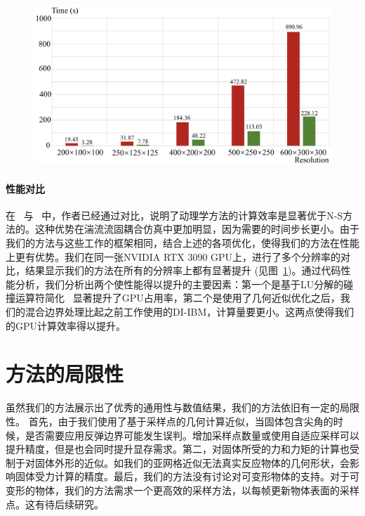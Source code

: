\begin{figure}[!tb]
  \centering
    \includegraphics[width=0.93\columnwidth]{figures/performance.png}
  \label{img:Performance}
\end{figure}

\paragraph{性能对比}
在~\citep{Li-2020} 与~\citep{Chen-2021} 中，作者已经通过对比，说明了动理学方法的计算效率是显著优于N-S方法的。这种优势在湍流流固耦合仿真中更加明显，因为需要的时间步长更小。由于我们的方法与这些工作的框架相同，结合上述的各项优化，使得我们的方法在性能上更有优势。我们在同一张NVIDIA RTX 3090 GPU上，进行了多个分辨率的对比，结果显示我们的方法在所有的分辨率上都有显著提升 (见图~\ref{img:Performance})。通过代码性能分析，我们分析出两个使性能得以提升的主要因素：第一个是基于LU分解的碰撞运算符简化~\citep{fei2018three} 显著提升了GPU占用率，第二个是使用了几何近似优化之后，我们的混合边界处理比起之前工作使用的DI-IBM，计算量要更小。这两点使得我们的GPU计算效率得以提升。

\section{方法的局限性}
虽然我们的方法展示出了优秀的通用性与数值结果，我们的方法依旧有一定的局限性。
首先，由于我们使用了基于采样点的几何计算近似，当固体包含尖角的时候，是否需要应用反弹边界可能发生误判。增加采样点数量或使用自适应采样可以提升精度，但是也会同时提升显存需求。第二，对固体所受的力和力矩的计算也受制于对固体外形的近似。如我们的亚网格近似无法真实反应物体的几何形状，会影响固体受力计算的精度。最后，我们的方法没有讨论对可变形物体的支持。对于可变形的物体，我们的方法需求一个更高效的采样方法，以每帧更新物体表面的采样点。这有待后续研究。

